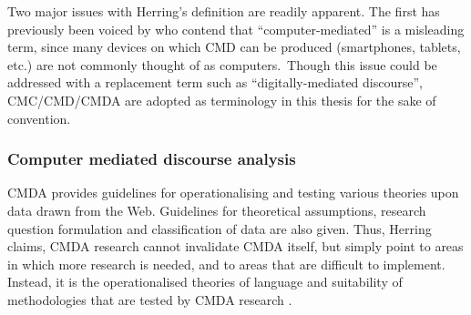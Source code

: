 
				Two major issues with Herring's definition are readily apparent. The first has previously been voiced by \textcite{jucker_linguistics_2012} who contend that ``computer-mediated'' is a misleading term, since many devices on which CMD can be produced (smartphones, tablets, etc.) are not commonly thought of as computers.~Though this issue could be addressed with a replacement term such as ``digitally-mediated discourse'', CMC/CMD/CMDA are adopted as terminology in this thesis for the sake of convention.

		\subsubsection{Computer mediated discourse analysis}

			CMDA provides guidelines for operationalising and testing various theories upon data drawn from the Web. Guidelines for theoretical assumptions, research question formulation and classification of data are also given. Thus, Herring claims, CMDA research cannot invalidate CMDA itself, but simply point to areas in which more research is needed, and to areas that are difficult to implement. Instead, it is the operationalised theories of language and suitability of methodologies that are tested by CMDA research \cite{herring_computer-mediated_2001,herring_computer-mediated_2004,herring_computer-mediated_2011}.

